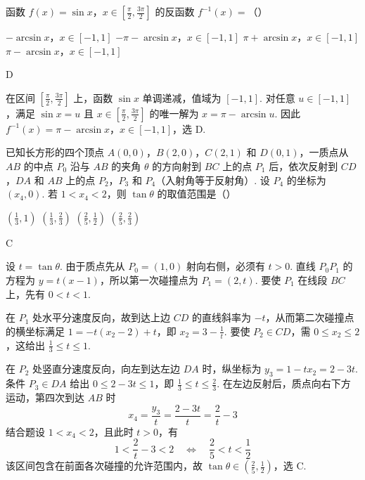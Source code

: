 \begin{problem}
函数 \(f(x) = \sin x\)，\(x \in \left[\frac{\pi}{2}, \frac{3\pi}{2}\right]\) 的反函数 \( f^{-1}(x) = \)（\quad）

\choices
    {\(-\arcsin x\)，\(x \in [-1,1]\)}
    {\(-\pi - \arcsin x\)，\(x \in [-1, 1]\)}
    {\(\pi + \arcsin x\)，\(x \in [-1, 1]\)}
    {\(\pi - \arcsin x\)，\(x \in [-1, 1]\)}
\end{problem}

\begin{answer}
D
\end{answer}

\begin{solution}
在区间 \(\left[\frac\pi2,\frac{3\pi}2\right]\) 上，函数 \(\sin x\) 单调递减，值域为 \([-1,1]\). 对任意 \(u\in[-1,1]\)，满足 \(\sin x=u\) 且 \(x\in\left[\frac\pi2,\frac{3\pi}2\right]\) 的唯一解为 \(x=\pi-\arcsin u\). 因此 \(f^{-1}(x)=\pi-\arcsin x\)，\(x\in[-1,1]\)，选 D.
\end{solution}

\begin{problem}
已知长方形的四个顶点 \(A(0,0)\)，\(B(2,0)\)，\(C(2,1)\) 和 \(D(0,1)\)，一质点从 \(AB\) 的中点 \(P_0\) 沿与 \(AB\) 的夹角 \(\theta\) 的方向射到 \(BC\) 上的点 \(P_1\) 后，依次反射到 \(CD\)，\(DA\) 和 \(AB\) 上的点 \(P_2\)，\(P_3\) 和 \(P_4\)（入射角等于反射角）. 设 \(P_4\) 的坐标为 \((x_4,0)\). 若 \(1 < x_4 < 2\)，则 \(\tan \theta\) 的取值范围是（\quad）

\choices
    {\(\left(\frac{1}{3}, 1\right)\)}
    {\(\left(\frac{1}{3}, \frac{2}{3}\right)\)}
    {\(\left(\frac{2}{5}, \frac{1}{2}\right)\)}
    {\(\left(\frac{2}{5}, \frac{2}{3}\right)\)}
\end{problem}

\begin{answer}
C
\end{answer}

\begin{solution}
设 \(t=\tan\theta\). 由于质点先从 \(P_0=(1,0)\) 射向右侧，必须有 \(t>0\). 直线 \(P_0P_1\) 的方程为 \(y=t(x-1)\)，所以第一次碰撞点为 \(P_1=(2,t)\). 要使 \(P_1\) 在线段 \(BC\) 上，先有 \(0<t<1\).

在 \(P_1\) 处水平分速度反向，故到达上边 \(CD\) 的直线斜率为 \(-t\)，从而第二次碰撞点的横坐标满足 \(1=-t(x_2-2)+t\)，即 \(x_2=3-\frac1t\). 要使 \(P_2\in CD\)，需 \(0\leqslant x_2\leqslant2\)，这给出 \(\frac13\leqslant t\leqslant1\).

在 \(P_2\) 处竖直分速度反向，向左到达左边 \(DA\) 时，纵坐标为 \(y_3=1-tx_2=2-3t\). 条件 \(P_3\in DA\) 给出 \(0\leqslant2-3t\leqslant1\)，即 \(\frac13\leqslant t\leqslant\frac23\). 在左边反射后，质点向右下方运动，第四次到达 \(AB\) 时
\[
x_4=\frac{y_3}{t}=\frac{2-3t}{t}=\frac2t-3
\]
结合题设 \(1<x_4<2\)，且此时 \(t>0\)，有
\[
1<\frac2t-3<2\quad\Longleftrightarrow\quad \frac25<t<\frac12
\]
该区间包含在前面各次碰撞的允许范围内，故 \(\tan\theta\in\left(\frac25,\frac12\right)\)，选 C.
\end{solution}

